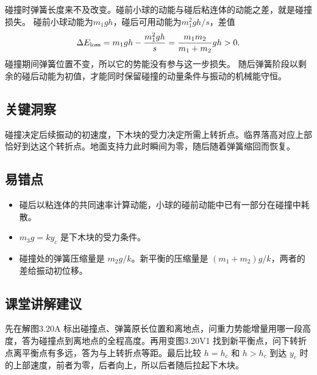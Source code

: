 \documentclass[UTF8,fontset=fandol,a4paper,11pt]{ctexart}
\begin{document}
碰撞时弹簧长度来不及改变。碰前小球的动能与碰后粘连体的动能之差，就是碰撞损失。
碰前小球动能为$m_1gh$，碰后可用动能为$m_1^2gh/s$，差值
\[
\Delta E_{\rm loss}=m_1gh-\frac{m_1^2gh}{s}
=\frac{m_1m_2}{m_1+m_2}gh>0.
\]
碰撞期间弹簧位置不变，所以它的势能没有参与这一步损失。
随后弹簧阶段以剩余的碰后动能为初值，才能同时保留碰撞的动量条件与振动的机械能守恒。




\subsection*{关键洞察}

碰撞决定后续振动的初速度，下木块的受力决定所需上转折点。临界落高对应上部恰好到达这个转折点。地面支持力此时瞬间为零，随后随着弹簧缩回而恢复。



\subsection*{易错点}

\begin{itemize}
\item 碰后以粘连体的共同速率计算动能，小球的碰前动能中已有一部分在碰撞中耗散。
\item $m_3g=ky_c$ 是下木块的受力条件。
\item 碰撞处的弹簧压缩量是 $m_2g/k$。新平衡的压缩量是 $(m_1+m_2)g/k$，两者的差给振动初位移。
\end{itemize}



\subsection*{课堂讲解建议}

先在解图3.20A 标出碰撞点、弹簧原长位置和离地点，问重力势能增量用哪一段高度，答为碰撞点到离地点的全程高度。再用变图3.20V1 找到新平衡点，问下转折点离平衡点有多远，答为与上转折点等距。最后比较 $h=h_c$ 和 $h>h_c$ 到达 $y_c$ 时的上部速度，前者为零，后者向上，所以后者随后拉起下木块。


\end{document}
